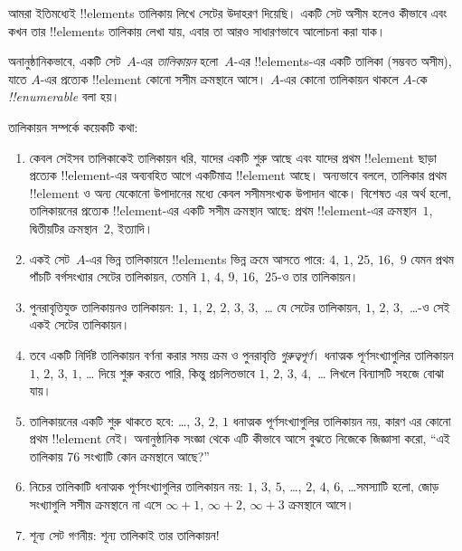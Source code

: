 \documentclass[../../../include/open-logic-section]{subfiles}
\begin{document}



\begin{explain}
আমরা ইতিমধ্যেই !!{element}s তালিকায় লিখে সেটের উদাহরণ দিয়েছি। একটি সেট অসীম হলেও কীভাবে এবং কখন তার !!{element}s তালিকায় লেখা যায়, এবার তা আরও সাধারণভাবে আলোচনা করা যাক।
\end{explain}

\begin{defn}[তালিকায়ন, অনানুষ্ঠানিকভাবে]
অনানুষ্ঠানিকভাবে, একটি সেট~$A$-এর \emph{তালিকায়ন} হলো~$A$-এর !!{element}s-এর একটি তালিকা (সম্ভবত অসীম), যাতে $A$-এর প্রত্যেক !!{element} কোনো সসীম ক্রমস্থানে আসে। $A$-এর কোনো তালিকায়ন থাকলে $A$-কে \emph{!!{enumerable}} বলা হয়।
\end{defn}

\begin{explain}
তালিকায়ন সম্পর্কে কয়েকটি কথা:
\begin{enumerate}
\item কেবল সেইসব তালিকাকেই তালিকায়ন ধরি, যাদের একটি শুরু আছে এবং যাদের প্রথম !!{element} ছাড়া প্রত্যেক !!{element}-এর অব্যবহিত আগে একটিমাত্র !!{element} আছে। অন্যভাবে বললে, তালিকার প্রথম !!{element} ও অন্য যেকোনো উপাদানের মধ্যে কেবল সসীমসংখ্যক উপাদান থাকে। বিশেষত এর অর্থ হলো, তালিকায়নের প্রত্যেক !!{element}-এর একটি সসীম ক্রমস্থান আছে: প্রথম !!{element}-এর ক্রমস্থান~$1$, দ্বিতীয়টির ক্রমস্থান~$2$, ইত্যাদি।
\item একই সেট~$A$-এর ভিন্ন তালিকায়নে !!{element}s ভিন্ন ক্রমে আসতে পারে: $4$, $1$, $25$, $16$,~$9$ যেমন প্রথম পাঁচটি বর্গসংখ্যার সেটের তালিকায়ন, তেমনি $1$, $4$, $9$, $16$,~$25$-ও তার তালিকায়ন।
\item পুনরাবৃত্তিযুক্ত তালিকায়নও তালিকায়ন: $1$, $1$, $2$, $2$, $3$, $3$,~\dots{} যে সেটের তালিকায়ন, $1$, $2$, $3$,~\dots{}-ও সেই একই সেটের তালিকায়ন।
\item তবে একটি নির্দিষ্ট তালিকায়ন বর্ণনা করার সময় ক্রম ও পুনরাবৃত্তি \emph{গুরুত্বপূর্ণ}। ধনাত্মক পূর্ণসংখ্যাগুলির তালিকায়ন $1$, $2$, $3$, $1$, \dots{} দিয়ে শুরু করতে পারি, কিন্তু প্রচলিতভাবে $1$, $2$, $3$, $4$,~\dots{} লিখলে বিন্যাসটি সহজে বোঝা যায়।
\item তালিকায়নের একটি শুরু থাকতে হবে: \dots, $3$, $2$, $1$ ধনাত্মক পূর্ণসংখ্যাগুলির তালিকায়ন নয়, কারণ এর কোনো প্রথম !!{element} নেই। অনানুষ্ঠানিক সংজ্ঞা থেকে এটি কীভাবে আসে বুঝতে নিজেকে জিজ্ঞাসা করো, ``এই তালিকায় 76 সংখ্যাটি কোন ক্রমস্থানে আছে?''
\item নিচের তালিকাটি ধনাত্মক পূর্ণসংখ্যাগুলির তালিকায়ন নয়: $1$, $3$, $5$, \dots, $2$, $4$, $6$, \dots\@ সমস্যাটি হলো, জোড় সংখ্যাগুলি সসীম ক্রমস্থানে না এসে $\infty + 1$, $\infty + 2$, $\infty +
  3$ ক্রমস্থানে আসে।
\item শূন্য সেট গণনীয়: শূন্য তালিকাই তার তালিকায়ন!{}
\end{enumerate}
\end{explain}
\end{document}
